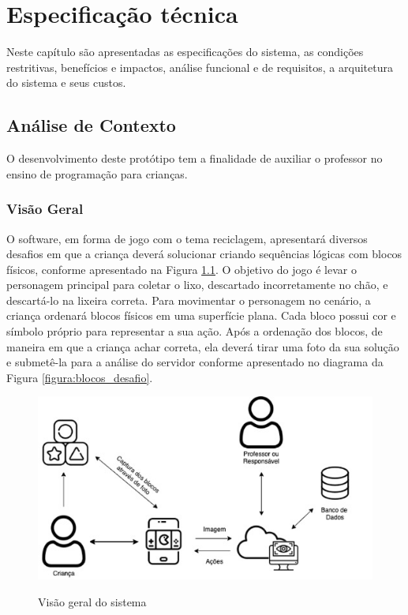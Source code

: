 \chapter{Especificação técnica} \label{cap:especificacao_tecnica}
Neste capítulo são apresentadas as especificações do sistema, as condições restritivas, benefícios e impactos, análise funcional e de requisitos, a arquitetura do sistema e seus custos.

\section{Análise de Contexto}

    O desenvolvimento deste protótipo tem a finalidade de auxiliar o professor no ensino de programação para crianças.
    
    \subsection{Visão Geral}
    
    O software, em forma de jogo com o tema reciclagem, apresentará diversos desafios em que a criança deverá solucionar criando sequências lógicas com blocos físicos, conforme apresentado na Figura \ref{figura:visao_geral}. O objetivo do jogo é levar o personagem principal para coletar o lixo, descartado incorretamente no chão, e descartá-lo na lixeira correta. Para movimentar o personagem no cenário, a criança ordenará blocos físicos em uma superfície plana. Cada bloco possui cor e símbolo próprio para representar a sua ação. Após a ordenação dos blocos, de maneira em que a criança achar correta, ela deverá tirar uma foto da sua solução e submetê-la para a análise do servidor conforme apresentado no diagrama da Figura \ref{figura:blocos_desafio}.
    
    \begin{figure}[H]
        \caption{Visão geral do sistema}
        \centering
        \includegraphics[width=\linewidth]{Imagens/Cap3/Visao_Geral.jpg}
        \label{figura:visao_geral}
    \end{figure}
    
